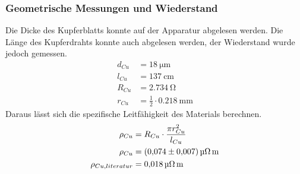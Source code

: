 \subsubsection{Geometrische Messungen und Wiederstand}
Die Dicke des Kupferblatts konnte auf der Apparatur abgelesen werden.
Die Länge des Kupferdrahts konnte auch abgelesen werden, der Wiederstand wurde jedoch gemessen.
\begin{align*}
    d_{Cu} &= \SI{18}{\micro \meter} \\
    l_{Cu} &= \SI{137}{\centi \meter}\\
    R_{Cu} &= \SI{2,734}{\ohm}\\
    r_{Cu} &= \frac{1}{2}\cdot \SI{0,218}{\milli \meter}
\end{align*}
Daraus lässt sich die spezifische Leitfähigkeit des Materials berechnen.
\begin{align*}
    \rho_{Cu} &= R_{Cu}\cdot \frac{\pi r_{Cu}^2}{l_{Cu}}\\
    \rho_{Cu} &= \SI{0,074\pm0,007}{\micro \ohm \meter}\\
    \rho_{Cu,literatur} &= \SI{0,018}{\micro \ohm \meter} %
\end{align*}
